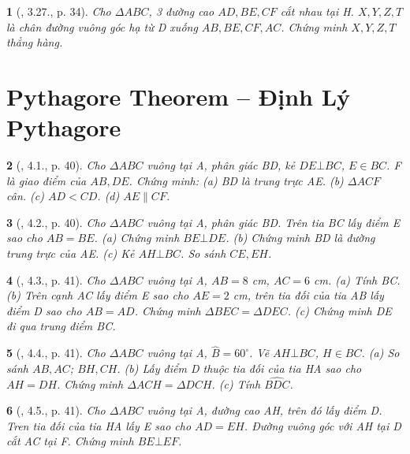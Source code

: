 \documentclass{article}
\newtheorem{baitoan}{}
\begin{document}
\begin{baitoan}[\cite{Hung_Mai_Toan_7_hinh_hoc}, 3.27., p. 34]
	Cho $\Delta ABC$, 3 đường cao $AD,BE,CF$ cắt nhau tại H. $X,Y,Z,T$ là chân đường vuông góc hạ từ D xuống $AB,BE,CF,AC$. Chứng minh $X,Y,Z,T$ thẳng hàng.
\end{baitoan}


\section{Pythagore Theorem -- Định Lý Pythagore}

\begin{baitoan}[\cite{Hung_Mai_Toan_7_hinh_hoc}, 4.1., p. 40]
	Cho $\Delta ABC$ vuông tại A, phân giác BD, kẻ $DE\bot BC$, $E\in BC$. F là giao điểm của $AB,DE$. Chứng minh: (a) BD là trung trực AE. (b) $\Delta ACF$ cân. (c) $AD < CD$. (d) $AE\parallel CF$.
\end{baitoan}

\begin{baitoan}[\cite{Hung_Mai_Toan_7_hinh_hoc}, 4.2., p. 40]
	Cho $\Delta ABC$ vuông tại A, phân giác BD. Trên tia BC lấy điểm E sao cho $AB = BE$. (a) Chứng minh $BE\bot DE$. (b) Chứng minh BD là đường trung trực của AE. (c) Kẻ $AH\bot BC$. So sánh $CE,EH$.
\end{baitoan}

\begin{baitoan}[\cite{Hung_Mai_Toan_7_hinh_hoc}, 4.3., p. 41]
	Cho $\Delta ABC$ vuông tại A, $AB = 8$ {\rm cm}, $AC = 6$ {\rm cm}. (a) Tính BC. (b) Trên cạnh AC lấy điểm E sao cho $AE = 2$ {\rm cm}, trên tia đối của tia AB lấy điểm D sao cho $AB = AD$. Chứng minh $\Delta BEC = \Delta DEC$. (c) Chứng minh DE đi qua trung điểm BC.
\end{baitoan}

\begin{baitoan}[\cite{Hung_Mai_Toan_7_hinh_hoc}, 4.4., p. 41]
	Cho $\Delta ABC$ vuông tại A, $\widehat{B} = 60^\circ$. Vẽ $AH\bot BC$, $H\in BC$. (a) So sánh $AB,AC$; $BH,CH$. (b) Lấy điểm D thuộc tia đối của tia HA sao cho $AH = DH$. Chứng minh $\Delta ACH = \Delta DCH$. (c) Tính $\widehat{BDC}$.
\end{baitoan}

\begin{baitoan}[\cite{Hung_Mai_Toan_7_hinh_hoc}, 4.5., p. 41]
	Cho $\Delta ABC$ vuông tại A, đường cao AH, trên đó lấy điểm D. Tren tia đối của tia HA lấy E sao cho $AD = EH$. Đường vuông góc với AH tại D cắt AC tại F. Chứng minh $BE\bot EF$.
\end{baitoan}
\end{document}
